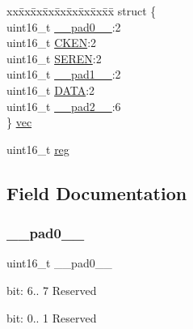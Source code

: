 \begin{DoxyCompactItemize}
\begin{tabbing}
\end{tabbing}\item 
\begin{tabbing}
xx\=xx\=xx\=xx\=xx\=xx\=xx\=xx\=xx\=\kill
struct \{\\
\>uint16\_t \mbox{\hyperlink{union_i2_s___s_y_n_c_b_u_s_y___type_a77132c2c26a75f5b8751b235cda23828}{\_\_pad0\_\_}}:2\\
\>uint16\_t \mbox{\hyperlink{union_i2_s___s_y_n_c_b_u_s_y___type_a8fbf0ea254eed96cce3d442019fad027}{CKEN}}:2\\
\>uint16\_t \mbox{\hyperlink{union_i2_s___s_y_n_c_b_u_s_y___type_a2e88a4907cf7d9c735e047eccc64ca77}{SEREN}}:2\\
\>uint16\_t \mbox{\hyperlink{union_i2_s___s_y_n_c_b_u_s_y___type_ab72e3a1f2f7db8695c60c658f5a0f11a}{\_\_pad1\_\_}}:2\\
\>uint16\_t \mbox{\hyperlink{union_i2_s___s_y_n_c_b_u_s_y___type_acd1c79d588901607c16e8e825ec70487}{DATA}}:2\\
\>uint16\_t \mbox{\hyperlink{union_i2_s___s_y_n_c_b_u_s_y___type_a82701c5ec65a0fca9a84d8edc46a8192}{\_\_pad2\_\_}}:6\\
\} \mbox{\hyperlink{union_i2_s___s_y_n_c_b_u_s_y___type_af58577b285f218af0f56cb8b99aadc65}{vec}}\\

\end{tabbing}\item 
uint16\+\_\+t \mbox{\hyperlink{union_i2_s___s_y_n_c_b_u_s_y___type_a11760f5020019f4aa8cb02e694f7cc44}{reg}}
\end{DoxyCompactItemize}


\subsection{Field Documentation}
\mbox{\label{union_i2_s___s_y_n_c_b_u_s_y___type_a77132c2c26a75f5b8751b235cda23828}} 
\subsubsection{\texorpdfstring{\_\_pad0\_\_}{\_\_pad0\_\_}}
{\footnotesize\ttfamily uint16\+\_\+t \+\_\+\+\_\+pad0\+\_\+\+\_\+}

bit\+: 6.. 7 Reserved

bit\+: 0.. 1 Reserved \mbox{\label{union_i2_s___s_y_n_c_b_u_s_y___type_ab72e3a1f2f7db8695c60c658f5a0f11a}} 
